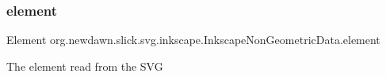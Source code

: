 \subsubsection{\texorpdfstring{element}{element}}
{\footnotesize\ttfamily Element org.\+newdawn.\+slick.\+svg.\+inkscape.\+Inkscape\+Non\+Geometric\+Data.\+element\hspace{0.3cm}{\ttfamily [private]}}

The element read from the S\+VG 